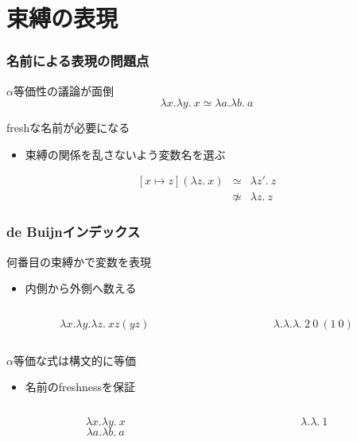 \documentclass[dvipdfmx,cjk,xcolor=dvipsnames,envcountsect,notheorems,12pt]{beamer}
\theoremstyle{definition}
\begin{document}
\section{束縛の表現}

\begin{frame}
	\frametitle{名前による表現の問題点}
	\LARGE $\alpha$等価性の議論が面倒
	\[ \lambda x.\lambda y.~x \simeq \lambda a.\lambda b.~a \]

	\vfill

	freshな名前が必要になる
	\begin{itemize}
		\item 束縛の関係を乱さないよう変数名を選ぶ
	\end{itemize}
	\[
		\begin{array}{lcl}
			[x \mapsto z](\lambda z.~x) & \simeq & \lambda z'.~z \\
																	& \not \simeq & \lambda z.~z
		\end{array}
	\]
\end{frame}

\begin{frame}
	\frametitle{de Buijnインデックス}
	\LARGE
	何番目の束縛かで変数を表現
	\begin{itemize}
		\item 内側から外側へ数える
	\end{itemize}
	\begin{columns}
		\begin{column}{0.5\textwidth}
			\[ \lambda x. \lambda y. \lambda z.~x z (y z) \]
		\end{column}
		\begin{column}{0.5\textwidth}
			\[ \lambda. \lambda. \lambda.~2~0~(1~0) \]
		\end{column}
	\end{columns}

	\vfill

	$\alpha$等価な式は構文的に等価
	\begin{itemize}
		\item 名前のfreshnessを保証
	\end{itemize}
	\begin{columns}
		\begin{column}{0.5\textwidth}
			\[ \lambda x.\lambda y.~x \]
			\[ \lambda a.\lambda b.~a \]
		\end{column}
		\begin{column}{0.5\textwidth}
			\[ \lambda.\lambda.~1 \]
		\end{column}
	\end{columns}
\end{frame}
\end{document}
